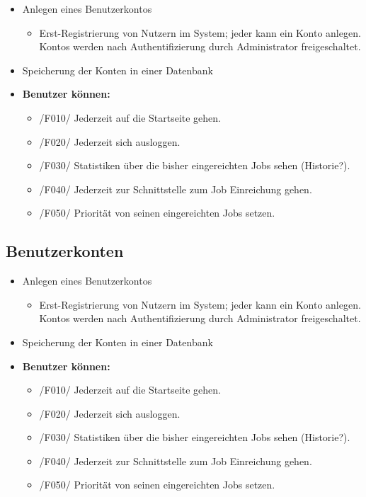 \begin{itemize}
    \item Anlegen eines Benutzerkontos
    \begin{itemize}
        \item Erst-Registrierung von Nutzern im System; jeder kann ein Konto anlegen. Kontos werden nach Authentifizierung durch Administrator freigeschaltet.
    \end{itemize}
    \item Speicherung der Konten in einer Datenbank
    \item \textbf{Benutzer können:}
    \begin{itemize}  
        \item /F010/ Jederzeit auf die Startseite gehen.
        \item /F020/ Jederzeit sich ausloggen.
        \item /F030/ Statistiken über die bisher eingereichten Jobs sehen (Historie?).
        \item /F040/ Jederzeit zur Schnittstelle zum Job Einreichung gehen.
        \item /F050/ Priorität von seinen eingereichten Jobs setzen.
    \end{itemize}
\end{itemize}





\subsection{Benutzerkonten}

\begin{itemize}
    \item Anlegen eines Benutzerkontos
    \begin{itemize}
        \item Erst-Registrierung von Nutzern im System; jeder kann ein Konto anlegen. Kontos werden nach Authentifizierung durch Administrator freigeschaltet.
    \end{itemize}
    \item Speicherung der Konten in einer Datenbank
    \item \textbf{Benutzer können:}
    \begin{itemize}  
        \item /F010/ Jederzeit auf die Startseite gehen.
        \item /F020/ Jederzeit sich ausloggen.
        \item /F030/ Statistiken über die bisher eingereichten Jobs sehen (Historie?).
        \item /F040/ Jederzeit zur Schnittstelle zum Job Einreichung gehen.
        \item /F050/ Priorität von seinen eingereichten Jobs setzen.
    \end{itemize}
\end{itemize}




